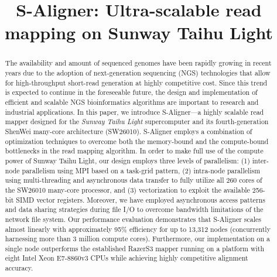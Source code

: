 \documentclass[conference]{IEEEtran}
\begin{document}
\title{S-Aligner: Ultra-scalable read mapping on Sunway Taihu Light}



\author{
\and
{}
\and
{}
\and
{}
}

\maketitle

\begin{abstract}
The availability and amount of sequenced genomes have been rapidly
growing in recent years due to the adoption of next-generation
sequencing (NGS) technologies that allow for high-throughput
short-read generation at highly competitive cost. Since this trend is
expected to continue in the foreseeable future, the design and
implementation of efficient and scalable NGS bioinformatics algorithms
are important to research and industrial applications.  In this paper,
we introduce S-Aligner---a highly scalable read mapper designed for
the \emph{Sunway Taihu Light} supercomputer and its fourth-generation
ShenWei many-core architecture (SW26010). S-Aligner employs a
combination of optimization techniques to overcome both the
memory-bound and the compute-bound bottlenecks in the read mapping
algorithm. In order to make full use of the compute power of Sunway
Taihu Light, our design employs three levels of parallelism: (1)
inter-node parallelism using MPI based on a task-grid pattern, (2)
intra-node parallelism using multi-threading and asynchronous data
transfer to fully utilize all 260 cores of the SW26010 many-core
processor, and (3) vectorization to exploit the available 256-bit SIMD
vector registers.  Moreover, we have employed asynchronous access
patterns and data sharing strategies during file I/O to overcome
bandwidth limitations of the network file system. Our performance
evaluation demonstrates that S-Aligner scales almost linearly with
approximately 95\% efficiency for up to 13,312 nodes (concurrently
harnessing more than 3 million compute cores). Furthermore, our
implementation on a single node outperforms the established RazerS3
mapper running on a platform with eight Intel Xeon E7-8860v3 CPUs
while achieving highly competitive alignment accuracy.
\end{abstract}
\end{document}
